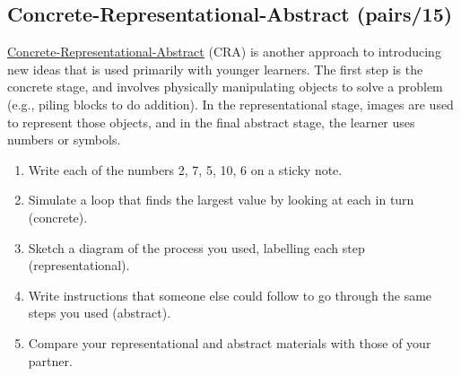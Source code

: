 \subsection{Concrete-Representational-Abstract (pairs/15)}\label{concrete-representational-abstract-pairs15}

\href{https://makingeducationfun.wordpress.com/2012/04/29/concrete-representational-abstract-cra/}{Concrete-Representational-Abstract} (CRA) is another approach to
introducing new ideas that is used primarily with younger
learners. The first step is the concrete stage, and involves
physically manipulating objects to solve a problem (e.g., piling
blocks to do addition). In the representational stage, images are
used to represent those objects, and in the final abstract stage, the
learner uses numbers or symbols.

\begin{enumerate}
\item
  Write each of the numbers 2, 7, 5, 10, 6 on a sticky note.
\item
  Simulate a loop that finds the largest value by looking at each in
  turn (concrete).
\item
  Sketch a diagram of the process you used, labelling each step
  (representational).
\item
  Write instructions that someone else could follow to go through the
  same steps you used (abstract).
\item
  Compare your representational and abstract materials with those of
  your partner.
\end{enumerate}
